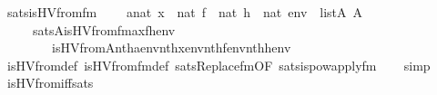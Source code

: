 \begin{isabellebody}
\endisatagproof
{\isafoldproof}%
%
\isadelimproof
\isanewline
%
\endisadelimproof
\isanewline
{}\isamarkupfalse%
\ sats{\isacharunderscore}{\kern0pt}is{\isacharunderscore}{\kern0pt}HVfrom{\isacharunderscore}{\kern0pt}fm\ {\isacharcolon}{\kern0pt}\isanewline
\ \ {\isachardoublequoteopen}{\isasymlbrakk}\ a{\isasymin}nat{\isacharsemicolon}{\kern0pt}\ x\ {\isasymin}\ nat{\isacharsemicolon}{\kern0pt}\ f\ {\isasymin}\ nat{\isacharsemicolon}{\kern0pt}\ h\ {\isasymin}\ nat{\isacharsemicolon}{\kern0pt}\ env\ {\isasymin}\ list{\isacharparenleft}{\kern0pt}A{\isacharparenright}{\kern0pt}{\isacharsemicolon}{\kern0pt}\ {}{\isasymin}A{\isasymrbrakk}\isanewline
\ \ \ \ {\isasymLongrightarrow}\ sats{\isacharparenleft}{\kern0pt}A{\isacharcomma}{\kern0pt}is{\isacharunderscore}{\kern0pt}HVfrom{\isacharunderscore}{\kern0pt}fm{\isacharparenleft}{\kern0pt}a{\isacharcomma}{\kern0pt}x{\isacharcomma}{\kern0pt}f{\isacharcomma}{\kern0pt}h{\isacharparenright}{\kern0pt}{\isacharcomma}{\kern0pt}env{\isacharparenright}{\kern0pt}\ {\isasymlongleftrightarrow}\isanewline
\ \ \ \ \ \ \ \ is{\isacharunderscore}{\kern0pt}HVfrom{\isacharparenleft}{\kern0pt}{\isacharhash}{\kern0pt}{\isacharhash}{\kern0pt}A{\isacharcomma}{\kern0pt}nth{\isacharparenleft}{\kern0pt}a{\isacharcomma}{\kern0pt}env{\isacharparenright}{\kern0pt}{\isacharcomma}{\kern0pt}nth{\isacharparenleft}{\kern0pt}x{\isacharcomma}{\kern0pt}env{\isacharparenright}{\kern0pt}{\isacharcomma}{\kern0pt}nth{\isacharparenleft}{\kern0pt}f{\isacharcomma}{\kern0pt}env{\isacharparenright}{\kern0pt}{\isacharcomma}{\kern0pt}nth{\isacharparenleft}{\kern0pt}h{\isacharcomma}{\kern0pt}env{\isacharparenright}{\kern0pt}{\isacharparenright}{\kern0pt}{\isachardoublequoteclose}\isanewline
%
\isadelimproof
\ \ %
\endisadelimproof
%
\isatagproof
{}\isamarkupfalse%
\ is{\isacharunderscore}{\kern0pt}HVfrom{\isacharunderscore}{\kern0pt}def\ is{\isacharunderscore}{\kern0pt}HVfrom{\isacharunderscore}{\kern0pt}fm{\isacharunderscore}{\kern0pt}def\ sats{\isacharunderscore}{\kern0pt}Replace{\isacharunderscore}{\kern0pt}fm{\isacharbrackleft}{\kern0pt}OF\ sats{\isacharunderscore}{\kern0pt}is{\isacharunderscore}{\kern0pt}powapply{\isacharunderscore}{\kern0pt}fm{\isacharbrackright}{\kern0pt}\isanewline
\ \ \isamarkupfalse%
\ simp%
\endisatagproof
{\isafoldproof}%
%
\isadelimproof
\isanewline
%
\endisadelimproof
\isanewline
{}\isamarkupfalse%
\ is{\isacharunderscore}{\kern0pt}HVfrom{\isacharunderscore}{\kern0pt}iff{\isacharunderscore}{\kern0pt}sats{\isacharcolon}{\kern0pt}\isanewline
\ \ \isanewline

\end{isabellebody}

